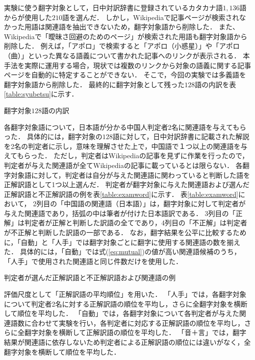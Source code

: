 \documentclass[japanese]{jnlp_1.4}
\begin{document}
{実験に使う翻字対象として，日中対訳辞書\cite{Book_02}に登録されているカタカナ語$1,136$語から\cite{Article_21}が使用した$210$語を選んだ．
しかし，Wikipediaで記事ページが検索されなかった用語は関連語を抽出できないため，翻字対象語から削除した．
また、Wikipediaで「曖昧さ回避のためのページ」が検索された用語も翻字対象語から削除した．
例えば，「アポロ」で検索すると「アポロ（小惑星）」や「アポロ（曲）」といった異なる語義について書かれた記事へのリンクが表示される．
本手法を実際に運用する場合，現状では複数のリンクから対象の語義に関する記事ページを自動的に特定することができない．
そこで，今回の実験では多義語を翻字対象語から削除した．
最終的に翻字対象として残った$128$語の内訳を表\ref{table:syubetsu}に示す．

\begin{table}[b]
\caption{翻字対象$128$語の内訳}
\label{table:syubetsu}

\end{table}

各翻字対象語について，日本語が分かる中国人判定者2名に関連語を与えてもらった．
具体的には，翻字対象の$128$語に対して，日中対訳辞書\cite{Book_02}に記載された解説を2名の判定者に示し，意味を理解させた上で，中国語で１つ以上の関連語を与えてもらった．
ただし，判定者はWikipediaの記事を見ずに作業を行ったので，判定者が与えた関連語が全てWikipediaの記事に載っているとは限らない．
各翻字対象語に対して，判定者は自分が与えた関連語に関わっていると判断した語を正解訳語として1つ以上選んだ．
判定者が翻字対象に与えた関連語および選んだ正解訳語と不正解訳語の例を表\ref{table:examword}に示す．
表\ref{table:examword}において，
2列目の「中国語の関連語（日本語）」は，翻字対象に対して判定者が与えた関連語であり，括弧の中は筆者が付けた日本語訳である．
3列目の「正解」は判定者が正解と判断した訳語の全てであり，4列目の「不正解」は判定者が不正解と判断した訳語の一部である．
なお，翻字結果を公平に比較するために，「自動」と「人手」では翻字対象ごとに翻字に使用する関連語の数を揃えた．
具体的には，「自動」では式(\ref{eq:mutual})の値が高い関連語候補のうち，「人手」で使用された関連語と同じ件数だけを使用した．

\begin{table}[b]
\caption{判定者が選んだ正解訳語と不正解訳語および関連語の例}
\label{table:examword}

\end{table}


評価尺度として「正解訳語の平均順位」を用いた．
「人手」では，各翻字対象について判定者2名に対する正解訳語の順位を平均し，さらに全翻字対象を横断して順位を平均した．
「自動」では，各翻字対象について各判定者が与えた関連語数に合わせて実験を行い，各判定者に対応する正解訳語の順位を平均し，さらに全翻字対象を横断して正解訳語の順位を平均した．
「音＋言」では，翻字結果が関連語に依存しないため判定者による正解訳語の順位には違いがなく，全翻字対象を横断して順位を平均した．

}
\end{document}
